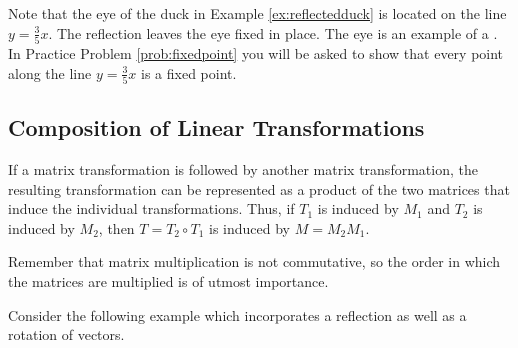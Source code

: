 \documentclass{ximera}
\begin{document}
Note that the eye of the duck in Example \ref{ex:reflectedduck} is located on the line $y=\frac{3}{5}x$.  The reflection leaves the eye fixed in place.  The eye is an example of a .  In Practice Problem \ref{prob:fixedpoint} you will be asked to show that every point along the line $y=\frac{3}{5}x$ is a fixed point.

\subsection*{Composition of Linear Transformations}

If a matrix transformation is followed by another matrix transformation, the resulting transformation can be represented as a product of the two matrices that induce the individual transformations.  Thus, if $T_1$ is induced by $M_1$ and $T_2$ is induced by $M_2$, then $T=T_2\circ T_1$ is induced by $M=M_2M_1$.

\begin{center}
\end{center}

Remember that matrix multiplication is not commutative, so the order in which the matrices are multiplied is of utmost importance.

Consider the following example which incorporates a reflection as well as a rotation of vectors.
\end{document}
